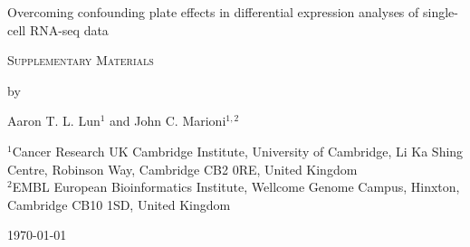 \documentclass{article}
\begin{document}
\begin{titlepage}
\vspace*{3cm}
\begin{center}

{\LARGE
Overcoming confounding plate effects in differential expression analyses of single-cell RNA-seq data
\par}

\vspace{0.75cm}

{\Large 
    \textsc{Supplementary Materials}
\par
}
\vspace{0.75cm}

\large
by

\vspace{0.75cm}
Aaron T. L. Lun$^{1}$ and John C. Marioni$^{1,2}$

\vspace{1cm}
\begin{minipage}{0.9\textwidth}
\begin{flushleft} 
$^1$Cancer Research UK Cambridge Institute, University of Cambridge, Li Ka Shing Centre, Robinson Way, Cambridge CB2 0RE, United Kingdom \\[6pt]
$^2$EMBL European Bioinformatics Institute, Wellcome Genome Campus, Hinxton, Cambridge CB10 1SD, United Kingdom \\[6pt]
\end{flushleft}
\end{minipage}

\vspace{1.5cm}
{\large \today{}}

\vspace*{\fill}
\end{center}
\end{titlepage}

\end{document}
